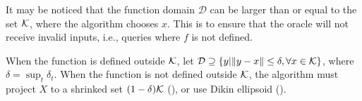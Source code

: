
It may be noticed that the function domain $\mathcal{D}$ can be larger than or equal to the set $\mathcal{K}$, where the algorithm chooses $x$. This is to ensure that the oracle will not receive invalid inputs, i.e., queries where $f$ is not defined.

When the function is defined outside $\mathcal{K}$, let $\mathcal{D} \supseteq \left\lbrace y \vert \|y-x\| \le \delta, \forall x \in \mathcal{K} \right\rbrace$, where $\delta=\sup_{t}\delta_t$. When the function is not defined outside $\mathcal{K}$, the algorithm must project $X$ to a shrinked set $(1-\delta)\mathcal{K}$ (\cite{flaxman2005online}), or use Dikin ellipsoid (\cite{AbHaRa08}).

